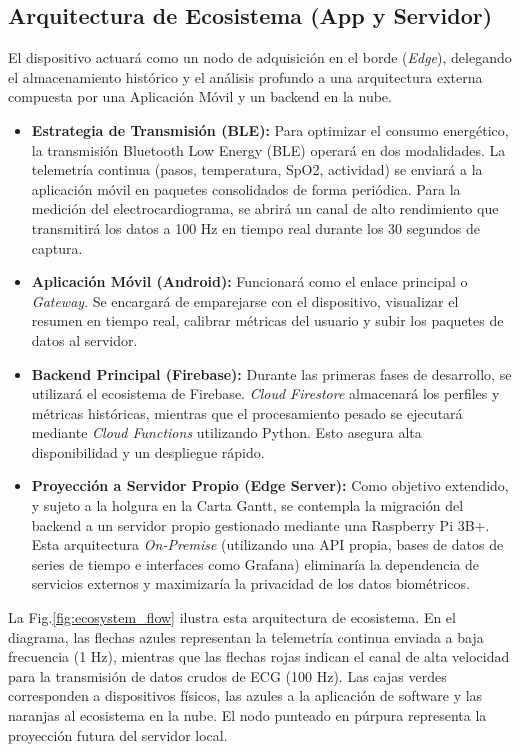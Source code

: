 \documentclass[letterpaper,11pt]{article}
\newcommand{\rfigura}[1]{Fig.\ref{#1}}
\begin{document}
\subsection{Arquitectura de Ecosistema (App y Servidor)}
El dispositivo actuará como un nodo de adquisición en el borde (\textit{Edge}), delegando el almacenamiento histórico y el análisis profundo a una arquitectura externa compuesta por una Aplicación Móvil y un backend en la nube.

\begin{itemize}
    \item \textbf{Estrategia de Transmisión (BLE):} Para optimizar el consumo energético, la transmisión Bluetooth Low Energy (BLE) operará en dos modalidades. La telemetría continua (pasos, temperatura, SpO2, actividad) se enviará a la aplicación móvil en paquetes consolidados de forma periódica. Para la medición del electrocardiograma, se abrirá un canal de alto rendimiento que transmitirá los datos a 100 Hz en tiempo real durante los 30 segundos de captura.
    \item \textbf{Aplicación Móvil (Android):} Funcionará como el enlace principal o \textit{Gateway}. Se encargará de emparejarse con el dispositivo, visualizar el resumen en tiempo real, calibrar métricas del usuario y subir los paquetes de datos al servidor.
    \item \textbf{Backend Principal (Firebase):} Durante las primeras fases de desarrollo, se utilizará el ecosistema de Firebase. \textit{Cloud Firestore} almacenará los perfiles y métricas históricas, mientras que el procesamiento pesado se ejecutará mediante \textit{Cloud Functions} utilizando Python. Esto asegura alta disponibilidad y un despliegue rápido.
    \item \textbf{Proyección a Servidor Propio (Edge Server):} Como objetivo extendido, y sujeto a la holgura en la Carta Gantt, se contempla la migración del backend a un servidor propio gestionado mediante una Raspberry Pi 3B+. Esta arquitectura \textit{On-Premise} (utilizando una API propia, bases de datos de series de tiempo e interfaces como Grafana) eliminaría la dependencia de servicios externos y maximizaría la privacidad de los datos biométricos.
\end{itemize}

La \rfigura{fig:ecosystem_flow} ilustra esta arquitectura de ecosistema. En el diagrama, las flechas azules representan la telemetría continua enviada a baja frecuencia (1 Hz), mientras que las flechas rojas indican el canal de alta velocidad para la transmisión de datos crudos de ECG (100 Hz). Las cajas verdes corresponden a dispositivos físicos, las azules a la aplicación de software y las naranjas al ecosistema en la nube. El nodo punteado en púrpura representa la proyección futura del servidor local.
\end{document}
